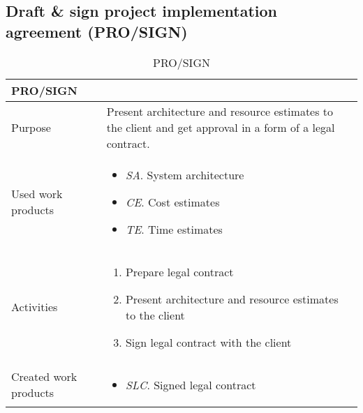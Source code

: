 \subsection{Draft \& sign project implementation agreement (PRO/SIGN)}
\begin{table}[h!]
\begin{tabular}{l|p{}}
\hline
\textbf{PRO/SIGN}        & \textbf{} \\ \hline
Purpose &  Present architecture and resource estimates to the client and get approval in a form of a legal contract. \\ \hline
Used work products    &      
\begin{itemize}
    \item \textit{SA}. System architecture
    \item \textit{CE}. Cost estimates
    \item \textit{TE}. Time estimates
\end{itemize}
\\ \hline
Activities            &   
\begin{enumerate}
    \item Prepare legal contract
    \item Present architecture and resource estimates to the client
    \item Sign legal contract with the client
\end{enumerate}
\\ \hline
Created work products &     
\begin{itemize}
    \item \textit{SLC}. Signed legal contract 
\end{itemize}
\end{tabular}
\caption{PRO/SIGN}
\label{pro/sign}
\end{table}

\newpage
